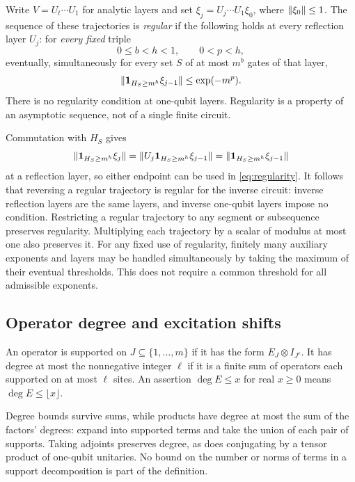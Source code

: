 \begin{definition}
\label{def:regular}
Write $V=U_t\cdots U_1$ for analytic layers and set
$\xi_j=U_j\cdots U_1\xi_0$, where $\lVert\xi_0\rVert\le1$.
The sequence of these trajectories is \emph{regular} if the following
holds at every reflection layer $U_j$: for \emph{every fixed} triple
\[
 0\le b<h<1,\qquad 0<p<h,
\]
eventually, simultaneously for every set $S$ of at most $m^b$ gates of
that layer,
\begin{equation}
 \lVert\mathbf 1_{H_S\ge m^h}\xi_{j-1}\rVert
 \le \exp(-m^p).
 \label{eq:regularity}
\end{equation}
There is no regularity condition at one-qubit layers.  Regularity is a
property of an asymptotic sequence, not of a single finite circuit.
\end{definition}

Commutation with $H_S$ gives
\[
 \lVert\mathbf 1_{H_S\ge m^h}\xi_j\rVert
 =\lVert U_j\mathbf 1_{H_S\ge m^h}\xi_{j-1}\rVert
 =\lVert\mathbf 1_{H_S\ge m^h}\xi_{j-1}\rVert
\]
at a reflection layer, so either endpoint can be used in
\eqref{eq:regularity}.  It follows that reversing a regular trajectory is
regular for the inverse circuit: inverse reflection layers are the same
layers, and inverse one-qubit layers impose no condition.  Restricting a
regular trajectory to any segment or subsequence preserves regularity.
Multiplying each trajectory by a scalar of modulus at most one also
preserves it.  For any fixed use of regularity, finitely many auxiliary
exponents and layers may be handled simultaneously by taking the maximum
of their eventual thresholds.  This does not require a common threshold
for all admissible exponents.

\subsection{Operator degree and excitation shifts}

\begin{definition}
\label{def:degree}
An operator is supported on $J\subseteq\{1,\ldots,m\}$ if it has the form
$E_J\otimes I_{J^c}$.  It has degree at most the nonnegative integer $\ell$
if it is a finite sum of operators each supported on at most $\ell$ sites.
An assertion $\deg E\le x$ for real $x\ge0$ means
$\deg E\le\lfloor x\rfloor$.
\end{definition}

Degree bounds survive sums, while products have degree at most the sum
of the factors' degrees: expand into supported terms and take the union
of each pair of supports.  Taking adjoints preserves degree, as does
conjugating by a tensor product of one-qubit unitaries.  No bound on the
number or norms of terms in a support decomposition is part of the
definition.

